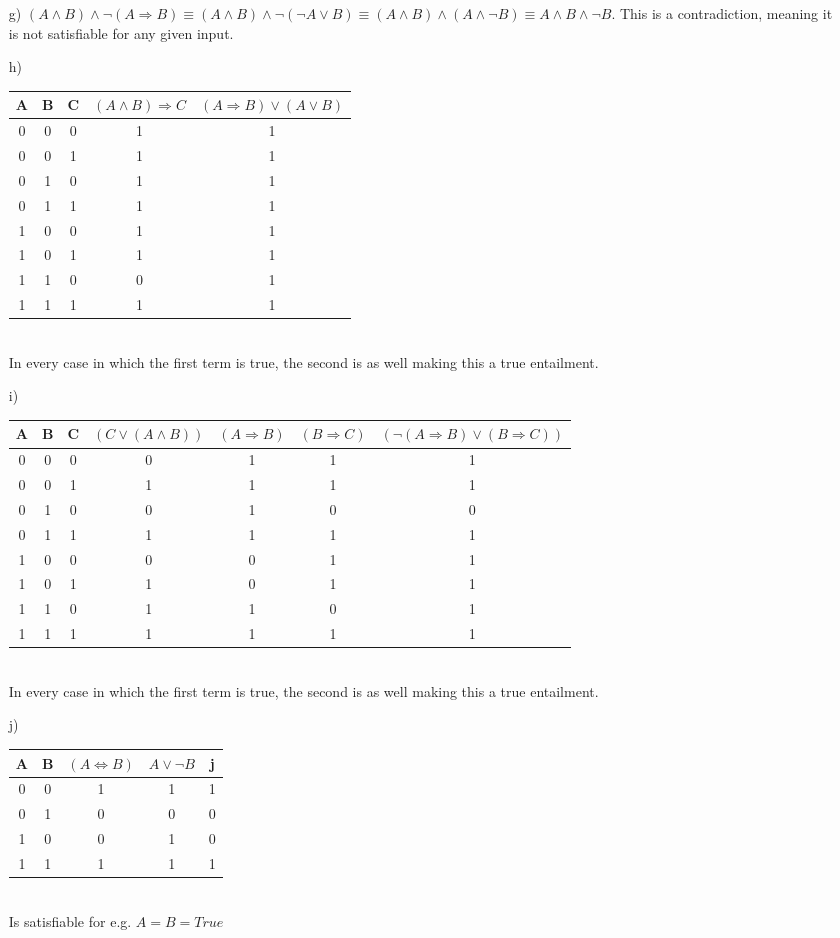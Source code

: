 \documentclass[a4paper]{article}
\begin{document}
\begin{itemize}
	\item[g)] $(A\land B) \land\neg (A \Rightarrow B) \equiv (A\land B) \land\neg (\neg A \lor B) \equiv (A\land B) \land (A \land  \neg B) \equiv A \land B \land \neg B$. This is a contradiction, meaning it is not satisfiable for any given input.
	\item[h)] \begin{tabular}{c | c | c || c | c }
		A & B & C & $(A \land B) \Rightarrow C$ & $(A \Rightarrow B) \lor (A \lor B)$ \\ \hline
		0 & 0 & 0 & 1 & 1 \\
		0 & 0 & 1 & 1 & 1 \\
		0 & 1 & 0 & 1 & 1 \\
		0 & 1 & 1 & 1 & 1 \\
		1 & 0 & 0 & 1 & 1 \\
		1 & 0 & 1 & 1 & 1 \\
		1 & 1 & 0 & 0 & 1 \\
		1 & 1 & 1 & 1 & 1 \\
	\end{tabular}\\
	In every case in which the first term is true, the second is as well making this a true entailment.
	\item[i)]
	\begin{tabular}{c | c | c || c | c | c | c}
		A & B & C & $(C \lor (A \land B))$ & $(A \Rightarrow B)$ & $(B \Rightarrow C)$ & $(\neg(A \Rightarrow B) \lor (B \Rightarrow C))$ \\ \hline
		0 & 0 & 0 & 0 & 1 & 1 & 1 \\
		0 & 0 & 1 & 1 & 1 & 1 & 1\\
		0 & 1 & 0 & 0 & 1 & 0 & 0\\
		0 & 1 & 1 & 1 & 1 & 1 & 1\\
		1 & 0 & 0 & 0 & 0 & 1 & 1\\
		1 & 0 & 1 & 1 & 0 & 1 & 1\\
		1 & 1 & 0 & 1 & 1 & 0 & 1\\
		1 & 1 & 1 & 1 & 1 & 1 & 1\\
	\end{tabular}\\
	In every case in which the first term is true, the second is as well making this a true entailment.
	\item[j)] \begin{tabular}{c | c || c | c | c }
		A & B & $(A \Leftrightarrow B)$ & $A \lor \neg B$ & j \\ \hline
		0 & 0 & 1 & 1 & 1 \\
		0 & 1 & 0 & 0 & 0 \\
		1 & 0 & 0 & 1 & 0 \\
		1 & 1 & 1 & 1 & 1 \\
	\end{tabular}\\
	Is satisfiable for e.g. $A = B = True$
\end{itemize}
\end{document}
